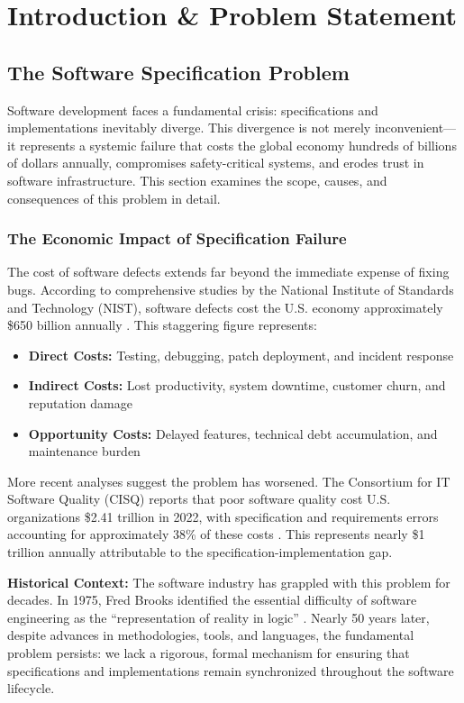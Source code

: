 \chapter{Introduction \& Problem Statement}

\section{The Software Specification Problem}

Software development faces a fundamental crisis: specifications and implementations inevitably diverge. This divergence is not merely inconvenient---it represents a systemic failure that costs the global economy hundreds of billions of dollars annually, compromises safety-critical systems, and erodes trust in software infrastructure. This section examines the scope, causes, and consequences of this problem in detail.

\subsection{The Economic Impact of Specification Failure}

The cost of software defects extends far beyond the immediate expense of fixing bugs. According to comprehensive studies by the National Institute of Standards and Technology (NIST), software defects cost the U.S. economy approximately \$650 billion annually \cite{nist2002}. This staggering figure represents:

\begin{itemize}
    \item \textbf{Direct Costs:} Testing, debugging, patch deployment, and incident response
    \item \textbf{Indirect Costs:} Lost productivity, system downtime, customer churn, and reputation damage
    \item \textbf{Opportunity Costs:} Delayed features, technical debt accumulation, and maintenance burden
\end{itemize}

More recent analyses suggest the problem has worsened. The Consortium for IT Software Quality (CISQ) reports that poor software quality cost U.S. organizations \$2.41 trillion in 2022, with specification and requirements errors accounting for approximately 38\% of these costs \cite{cisq2022}. This represents nearly \$1 trillion annually attributable to the specification-implementation gap.

\textbf{Historical Context:} The software industry has grappled with this problem for decades. In 1975, Fred Brooks identified the essential difficulty of software engineering as the ``representation of reality in logic'' \cite{brooks1975mythical}. Nearly 50 years later, despite advances in methodologies, tools, and languages, the fundamental problem persists: we lack a rigorous, formal mechanism for ensuring that specifications and implementations remain synchronized throughout the software lifecycle.

